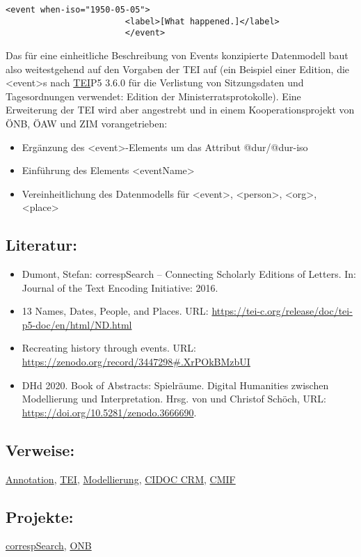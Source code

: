 \documentclass{article}
\begin{document}
        \begin{verbatim}<event when-iso="1950-05-05">
                        <label>[What happened.]</label>
                        </event>\end{verbatim}Das für eine einheitliche Beschreibung von Events konzipierte Datenmodell baut
                     also weitestgehend auf den Vorgaben der TEI auf (ein Beispiel einer Edition, die <event>s nach \href{http://gams.uni-graz.at/o:konde.178}{TEI}P5 3.6.0 für die Verlistung von Sitzungsdaten und Tagesordnungen verwendet: Edition der Ministerratsprotokolle). Eine Erweiterung der TEI wird
                     aber angestrebt und in einem Kooperationsprojekt von ÖNB, ÖAW und ZIM
                     vorangetrieben:\\
            
        \begin{itemize}\item {Ergänzung des <event>-Elements um das Attribut @dur/@dur-iso}\item {Einführung des Elements <eventName>}\item {Vereinheitlichung des Datenmodells für <event>,
                        <person>, <org>,
                        <place>}\end{itemize}\subsection*{Literatur:}\begin{itemize}\item Dumont, Stefan: correspSearch – Connecting Scholarly Editions of
                                 Letters. In: Journal of the Text Encoding Initiative: 2016.\item 13 Names, Dates, People, and Places. URL: \url{https://tei-c.org/release/doc/tei-p5-doc/en/html/ND.html}\item Recreating history through events. URL: \url{https://zenodo.org/record/3447298#.XrPOkBMzbUI}\item DHd 2020. Book of Abstracts: Spielräume. Digital
                                 Humanities zwischen Modellierung und Interpretation. Hrsg. von  und Christof Schöch, URL: \url{https://doi.org/10.5281/zenodo.3666690}.\end{itemize}\subsection*{Verweise:}\href{https://gams.uni-graz.at/o:konde.17}{Annotation}, \href{https://gams.uni-graz.at/o:konde.178}{TEI}, \href{https://gams.uni-graz.at/o:konde.137}{Modellierung}, \href{https://gams.uni-graz.at/o:konde.133}{CIDOC CRM}, \href{https://gams.uni-graz.at/o:konde.42}{CMIF}\subsection*{Projekte:}\href{https://correspsearch.net}{correspSearch}, \href{https://labs.onb.ac.at/gitlab/digital-editions/eventSearch}{ONB
}
\end{document}

